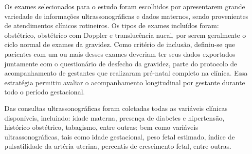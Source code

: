 \documentclass[12pt, a4paper]{report}
\theoremstyle{definition}
\theoremstyle{remark}
\theoremstyle{plain}
\begin{document}
Os exames selecionados para o estudo foram escolhidos por apresentarem grande variedade de informações ultrassonográficas e dados maternos, sendo provenientes de atendimentos clínicos rotineiros. Os tipos de exames incluídos foram: obstétrico, obstétrico com Doppler e translucência nucal, por serem geralmente o ciclo normal de exames da gravidez. Como critério de inclusão, definiu-se que pacientes com um ou mais desses exames deveriam ter seus dados exportados juntamente com o questionário de desfecho da gravidez, parte do protocolo de acompanhamento de gestantes que realizaram pré-natal completo na clínica. Essa estratégia permitiu avaliar o acompanhamento longitudinal por gestante durante todo o período gestacional.

Das consultas ultrassonográficas foram coletadas todas as variáveis clínicas disponíveis, incluindo: idade materna, presença de diabetes e hipertensão, histórico obstétrico, tabagismo, entre outras; bem como variáveis ultrassonográficas, tais como idade gestacional, peso fetal estimado, índice de pulsatilidade da artéria uterina, percentis de crescimento fetal, entre outras.

\setlength{\tabcolsep}{4pt}
\renewcommand{\arraystretch}{1.25}
\end{document}
